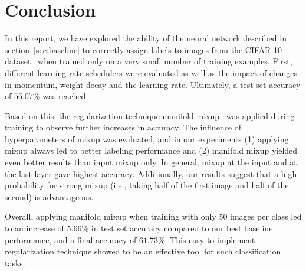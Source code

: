 \section{Conclusion}
\label{sec:conclusion}

In this report, we have explored the ability of the neural network described in section~\ref{sec:baseline} to correctly assign labels to images from the CIFAR-10 dataset~\cite{krizh09} when trained only on a very small number of training examples. First, different learning rate schedulers were evaluated as well as the impact of changes in momentum, weight decay and the learning rate. Ultimately, a test set accuracy of $56.07\%$ was reached.

Based on this, the regularization technique manifold mixup~\cite{verma19} was applied during training to observe further increases in accuracy. The influence of hyperparameters of mixup was evaluated, and in our experiments (1) applying mixup always led to better labeling performance and (2) manifold mixup yielded even better results than input mixup only. In general, mixup at the input and at the last layer gave highest accuracy. Additionally, our results suggest that a high probability for strong mixup (i.e., taking half of the first image and half of the second) is advantageous.

Overall, applying manifold mixup when training with only 50 images per class led to an increase of $5.66\%$ in test set accuracy compared to our best baseline performance, and a final accuracy of $61.73\%$. This easy-to-implement regularization technique showed to be an effective tool for such classification tasks.